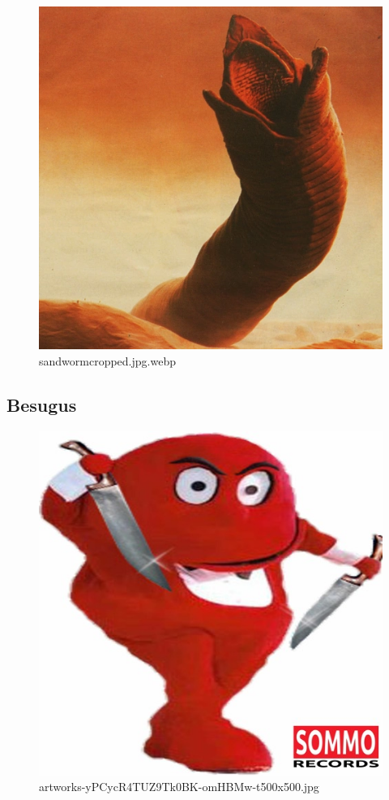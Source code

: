 \begin{figure}
\centering
\includegraphics{sandwormcropped.jpg.webp}
\caption{sandwormcropped.jpg.webp}
\end{figure}

\subsection{Besugus}\label{besugus}

\begin{figure}
\centering
\includegraphics{artworks-yPCycR4TUZ9Tk0BK-omHBMw-t500x500.jpg}
\caption{artworks-yPCycR4TUZ9Tk0BK-omHBMw-t500x500.jpg}
\end{figure}

